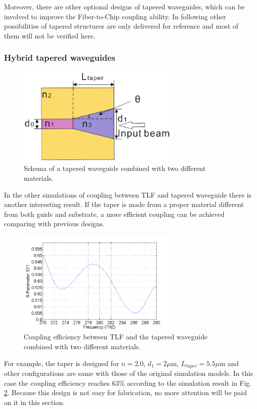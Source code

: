 Moreover, there are other optional designs of tapered waveguides, which can be involved to improve the Fiber-to-Chip coupling ability. In following other possibilities of tapered structures are only delivered for reference and most of them will not be verified here.   \\
\subsubsection*{Hybrid tapered waveguides}%
\begin{figure}[!ht]
\centering
\includegraphics[width=0.7\textwidth]{bilder/tapered_waveguide_others}
\caption{Schema of a tapered waveguide combined with two different materials.}
\label{fig:tapered_waveguide_others}
\end{figure} 
In the other simulations of coupling between TLF and tapered waveguide there is another interesting result. If the taper is made from a proper material different from both guide and substrate, a more efficient coupling can be achieved comparing with previous designs.\\

\begin{figure}[!ht]
\centering
\includegraphics[width=0.7\textwidth]{bilder/s21_tapered_waveguide_others}
\caption{Coupling efficiency between TLF and the tapered waveguide combined with two different materials.}
\label{fig:tapered_waveguide_others_coupling}
\end{figure} 
For example, the taper is designed for $n=2.0$, $d_{1}=2\mu$m, $L_{taper}=5.5\mu$m and other configurations are same with those of the original simulation models. In this case the coupling efficiency reaches $63\%$ according to the simulation result in Fig. \ref{fig:tapered_waveguide_others_coupling}.  Because this design is not easy for fabrication, no more attention will be paid on it in this section.\\
   
